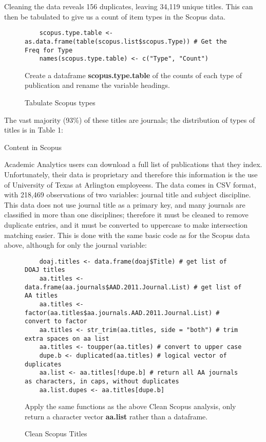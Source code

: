 \documentclass{article}
\begin{document}
Cleaning the data reveals 156 duplicates, leaving 34,119 unique titles. 
This can then be tabulated to give us a count of item types in the Scopus data.
\begin{figure}[htp]
	\centering
	\begin{lstlisting}
	scopus.type.table <- as.data.frame(table(scopus.list$scopus.Type)) # Get the Freq for Type
	names(scopus.type.table) <- c("Type", "Count")
	\end{lstlisting}
	\footnotesize{
		Create a dataframe \textbf{scopus.type.table} of the counts of each type of publication and rename the variable headings.
			}
	\caption{Tabulate Scopus types}
\end{figure}

The vast majority (93\%) of these titles are journals; the distribution of types of titles is in Table 1:
\begin{table}[htpb]
	\centering
	\caption{Content in Scopus}
\end{table}

Academic Analytics users can download a full list of publications that they index. 
Unfortunately, their data is proprietary and therefore this information is the use of University of Texas at Arlington employeess. 
The data comes in CSV format, with 218,469 observations of two variables: journal title and subject discipline.
This data does not use journal title as a primary key, and many journals are classified in more than one disciplines; therefore it must be cleaned to remove duplicate entries, and it must be converted to uppercase to make intersection matching easier.
This is done with the same basic code as for the Scopus data above, although for only the journal variable:
\begin{figure}[htp]
	\centering
	\begin{lstlisting}
	doaj.titles <- data.frame(doaj$Title) # get list of DOAJ titles
	aa.titles <- data.frame(aa.journals$AAD.2011.Journal.List) # get list of AA titles
	aa.titles <- factor(aa.titles$aa.journals.AAD.2011.Journal.List) # convert to factor
	aa.titles <- str_trim(aa.titles, side = "both") # trim extra spaces on aa list
	aa.titles <- toupper(aa.titles) # convert to upper case
	dupe.b <- duplicated(aa.titles) # logical vector of duplicates
	aa.list <- aa.titles[!dupe.b] # return all AA journals as characters, in caps, without duplicates
	aa.list.dupes <- aa.titles[dupe.b]
	\end{lstlisting}
	\footnotesize{
		Apply the same functions as the above Clean Scopus analysis, only return a character vector \textbf{aa.list} rather than a dataframe. 
			}
	\caption{Clean Scopus Titles}
\end{figure}
\end{document}

